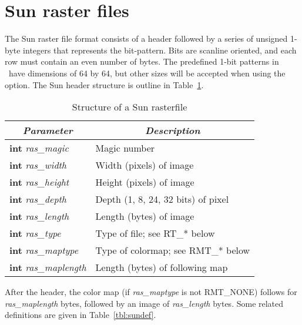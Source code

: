 \section{Sun raster files}

The Sun raster file format consists of a header followed by a series
of unsigned 1-byte integers that represents the bit-pattern.  Bits
are scanline oriented, and each row must contain an even number of
bytes.  The predefined 1-bit
patterns in \GMT\ have dimensions of 64 by 64, but other sizes will be
accepted when using the  option.  The Sun header structure
is outline in Table~\ref{tbl:sunheader}.

\begin{table}[H]
\centering

\begin{tabular}{|l|l|}	\hline
\multicolumn{1}{|c}{\emph{Parameter}}	&	\multicolumn{1}{|c|}{\emph{Description}}	\\ \hline
{\bf int} {\it ras\_magic}	&	Magic number  \\ \hline
{\bf int} {\it ras\_width}	&	Width (pixels) of image  \\ \hline
{\bf int} {\it ras\_height}	&	Height (pixels) of image  \\ \hline
{\bf int} {\it ras\_depth}	&	Depth (1, 8, 24, 32 bits) of pixel  \\ \hline
{\bf int} {\it ras\_length}	&	Length (bytes) of image  \\ \hline
{\bf int} {\it ras\_type}	&	Type of file; see RT\_* below  \\ \hline
{\bf int} {\it ras\_maptype}	&	Type of colormap; see RMT\_* below  \\ \hline
{\bf int} {\it ras\_maplength}	&	Length (bytes) of following map  \\ \hline
\end{tabular}

\caption{Structure of a Sun rasterfile}
\label{tbl:sunheader}
\end{table} 

After the header, the color map (if {\it ras\_maptype} is not RMT\_NONE)
follows for {\it ras\_maplength} bytes, followed by an image of
{\it ras\_length} bytes.  Some related definitions are given in Table~\ref{tbl:sundef}.  


